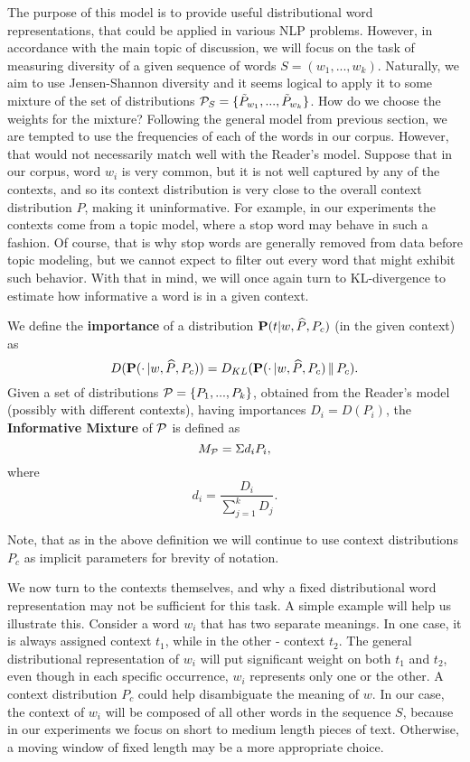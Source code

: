 The purpose of this model is to provide useful distributional
word representations, that could be applied in various NLP
problems. However, in accordance with the main topic of discussion, we will
focus on the task of measuring diversity of a given sequence of words
$S=(w_1,...,w_k)$. Naturally, we aim to use Jensen-Shannon diversity
and it seems logical to apply it to some mixture of the set of
distributions ${\mathcal P}_S=\{\tilde{P}_{w_1},...,\tilde{P}_{w_k}\}$. How do we choose the weights
for the mixture? Following the general model from previous section, we
are tempted to use the frequencies of each of the words in our
corpus. However, that would not  
necessarily match well with the Reader's model. Suppose that in our
corpus, word $w_i$ is very common, but it is not well captured by any of
the contexts, and so its context distribution is very close to the overall
context distribution $P$, making it uninformative. For example, in our
experiments the contexts come from a topic model, where a stop word may
behave in such a fashion. Of course, that is why stop words are
generally removed from data before topic modeling, but we cannot
expect to filter out every word that might exhibit such behavior. With
that in mind, we will once again turn to KL-divergence to
estimate how informative a word is in a given context.

\bed\label{mixture}
We define the {\bf importance} of a distribution $\operatorname{\mathbf{P}}(t|w,\widehat{P},P_c)$ (in 
the given context) as
\[D(\operatorname{\mathbf{P}}(\cdot\,|w,\widehat{P},P_c)) =
D_{KL}(\operatorname{\mathbf{P}}(\cdot\,|w,\widehat{P},P_c)\,\|\,P_c).\]
Given a set of distributions ${\mathcal P} = \{P_1,...,P_k\}$, obtained from the
Reader's model (possibly with different contexts), having importances
$D_i=D(P_i)$, the {\bf Informative Mixture} of ${\mathcal P}$ is defined as
\[M_{{\mathcal P}} = \Sigma d_i P_i,\]
where
\[d_i = \frac{D_i}{\sum_{j=1}^k D_j}.\]
\eed

Note, that as in the above definition we will continue to use context
distributions $P_c$ as implicit parameters for brevity of notation.  


We now turn to the contexts themselves, and why a fixed distributional
word representation may not be sufficient for this task. A simple example will
help us illustrate this. Consider a word $w_i$ that has
two separate meanings. In one case, it is always assigned context $t_1$,
while in the other - context $t_2$. The general distributional
representation of $w_i$ will put significant weight on both $t_1$ and
$t_2$, even though in each specific occurrence, $w_i$ represents only one
or the other. A context distribution $P_c$ could help disambiguate
the meaning of $w$. In our case, the context of $w_i$ will be composed of
all other words in the sequence $S$, because in our experiments we
focus on short to medium length pieces of text. Otherwise, a moving
window of fixed length may be a more appropriate choice.

